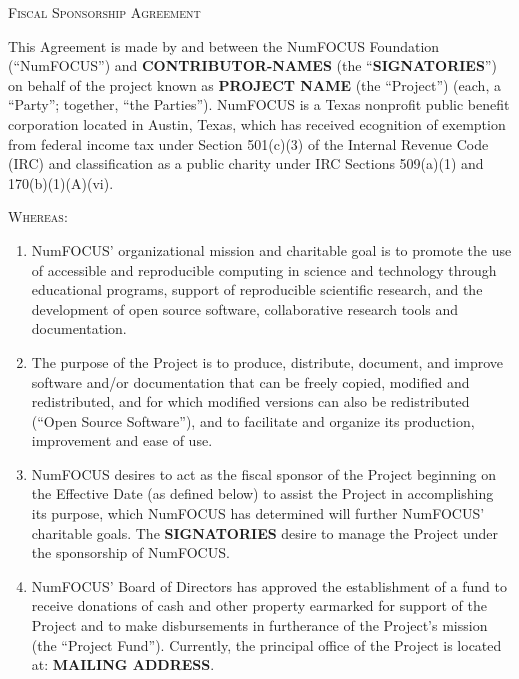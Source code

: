 \documentclass[english,letterpaper,12pt]{article}
\newcommand{\project}{\textbf{PROJECT NAME}}
\newcommand{\contributors}{\textbf{CONTRIBUTOR-NAMES}}
\newcommand{\signatories}{\textbf{SIGNATORIES}}
\newcommand{\leadershipaddress}{\textbf{MAILING ADDRESS}}
\begin{document}
\begin{center}
\textsc{\Huge Fiscal Sponsorship Agreement}{\Huge {} } 
\par\end{center}

\bigskip{}

This Agreement is made by and between the NumFOCUS Foundation (``NumFOCUS'')
and \contributors{} (the ``\signatories{}'') on behalf of the project known as
\project{} (the ``Project'') (each, a ``Party''; together, ``the Parties'').
NumFOCUS is a Texas nonprofit public benefit corporation located in Austin,
Texas, which has received ecognition of exemption from federal income tax under
Section 501(c)(3) of the Internal Revenue Code (IRC) and classification as a
public charity under IRC Sections 509(a)(1) and 170(b)(1)(A)(vi).

\textsc{Whereas:}

\begin{enumerate}[label=\Alph*.,ref=\S \Alph*]

\item NumFOCUS' organizational mission and charitable goal is to promote the
  use of accessible and reproducible computing in science and technology
  through educational programs, support of reproducible scientific research,
  and the development of open source software, collaborative research tools and
  documentation.

\item The purpose of the Project is to produce, distribute, document, and
  improve software and/or documentation that can be freely copied, modified and
  redistributed, and for which modified versions can also be redistributed
  (``Open Source Software''), and to facilitate and organize its production,
  improvement and ease of use.

\item NumFOCUS desires to act as the fiscal sponsor of the Project beginning on
  the Effective Date (as defined below) to assist the Project in accomplishing
  its purpose, which NumFOCUS has determined will further NumFOCUS' charitable
  goals. The \signatories{} desire to manage the Project under the sponsorship
  of NumFOCUS.

\item NumFOCUS' Board of Directors has approved the establishment of a fund to
  receive donations of cash and other property earmarked for support of the
  Project and to make disbursements in furtherance of the Project's mission
  (the ``Project Fund''). Currently, the principal office of the Project is
  located at: \leadershipaddress{}.

\end{enumerate}
\end{document}
